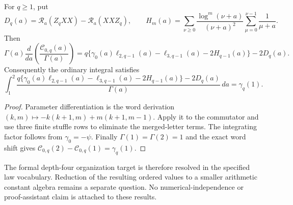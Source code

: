 \begin{theorem}\label{ojnf:thm:Gamma}
For $q\ge1$, put
\[
 D_q(a)=\mathcal R_a(Z_qXX)-\mathcal R_a(XXZ_q),\qquad
 H_m(a)=\sum_{\nu\ge0}\frac{\log^m(\nu+a)}{(\nu+a)^2}
                       \sum_{\mu=0}^{\nu-1}\frac1{\mu+a}.
\]
Then
\[
 \Gamma(a)\frac{d}{da}\left(\frac{\mathcal C_{0,q}(a)}{\Gamma(a)}\right)
 =q\{\gamma_0(a)\ell_{2,q-1}(a)-\ell_{3,q-1}(a)-2H_{q-1}(a)\}-2D_q(a).
\]
Consequently the ordinary integral satisfies
\[
 \int_1^2\frac{q\{\gamma_0(a)\ell_{2,q-1}(a)-\ell_{3,q-1}(a)
                         -2H_{q-1}(a)\}-2D_q(a)}{\Gamma(a)}\,da
 =\gamma_q(1).
\]
\end{theorem}
\begin{proof}
Parameter differentiation is the word derivation
$(k,m)\mapsto-k(k+1,m)+m(k+1,m-1)$. Apply it to the commutator and
use three finite stuffle rows to eliminate the merged-letter terms.
The integrating factor follows from $\gamma_0=-\psi$.
Finally $\Gamma(1)=\Gamma(2)=1$ and the exact word shift gives
$\mathcal C_{0,q}(2)-\mathcal C_{0,q}(1)=\gamma_q(1)$.
\end{proof}

The formal depth-four organization target is therefore resolved in the
specified law vocabulary. Reduction of the resulting ordered values to a
smaller arithmetic constant algebra remains a separate question. No
numerical-independence or proof-assistant claim is attached to these results.
